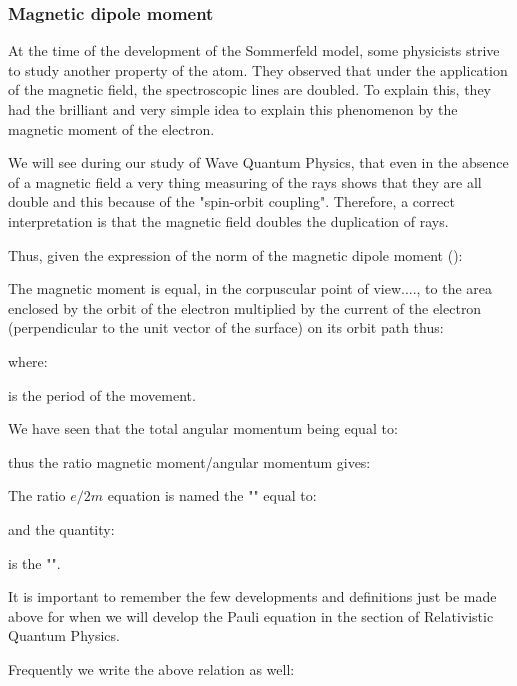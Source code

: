	
	\pagebreak
	\subsubsection{Magnetic dipole moment}\label{magnetic dipole moment}
	At the time of the development of the Sommerfeld model, some physicists strive to study another property of the atom. They observed that under the application of the magnetic field, the spectroscopic lines are doubled. To explain this, they had the brilliant and very simple idea  to explain this phenomenon by the magnetic moment of the electron.
	\begin{tcolorbox}[title=Remark,colframe=black,arc=10pt]
	We will see during our study of Wave Quantum Physics, that even in the absence of a magnetic field a very thing measuring of the rays shows that they are all double and this because of the "spin-orbit coupling". Therefore, a correct interpretation is that the magnetic field doubles the duplication of rays.
	\end{tcolorbox}
	Thus, given the expression of the norm of the magnetic dipole moment ():
	
	The magnetic moment is equal, in the corpuscular point of view...., to the area enclosed by the orbit of the electron multiplied by the current of the electron (perpendicular to the unit vector of the surface) on its orbit path thus:
	
	where:
	
	is the period of the movement.
	
	We have seen that the total angular momentum being equal to:
     
      thus the ratio magnetic moment/angular momentum gives:
      
      The ratio $e/2m$ equation is named the "" equal to:
      
     and the quantity:
     
     is the "".
    \begin{tcolorbox}[title=Remark,colframe=black,arc=10pt]
	It is important to remember the few developments and definitions just be made above for when we will develop the Pauli equation in the section of Relativistic Quantum Physics.
	\end{tcolorbox}
	Frequently we write the above relation as well:
    

